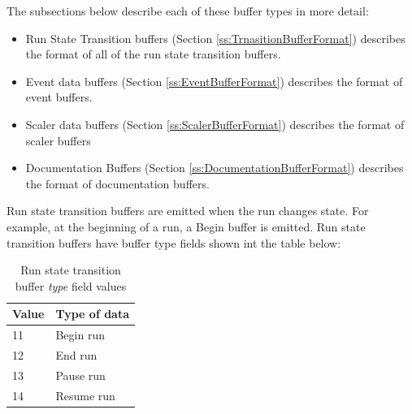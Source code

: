    \begin{iftex}
      The subsections below describe each of these buffer types in 
      more detail:
      
      \begin{itemize}
         \item Run State Transition buffers 
            (Section \ref{ss:TrnasitionBufferFormat}) describes the
            format of all of the run state transition buffers.
         \item Event data buffers 
            (Section \ref{ss:EventBufferFormat}) describes the
            format of event buffers.
         \item Scaler data buffers
            (Section \ref{ss:ScalerBufferFormat}) describes the
            format of scaler buffers
         \item Documentation Buffers
            (Section \ref{ss:DocumentationBufferFormat}) describes
            the format of documentation buffers.
      \end{itemize}
      
   \end{iftex}
	   Run state transition buffers are emitted when the run changes
	state.  For example, at the beginning of a run, a Begin buffer is
	emitted.   Run state transition buffers have buffer type fields shown 
	int the table below:
 
   \begin{table}[htb]
      \caption{Run state transition buffer {\em type} field values}
      \begin{tabular}{|l|l|}
         \hline
         {\bf Value}         & {\bf Type of data } \\
         \hline
         11             & Begin run \\
         12             & End run \\
         13             & Pause run \\
         14             & Resume run \\
         \hline
      \end{tabular}
    \end{table}	
   
